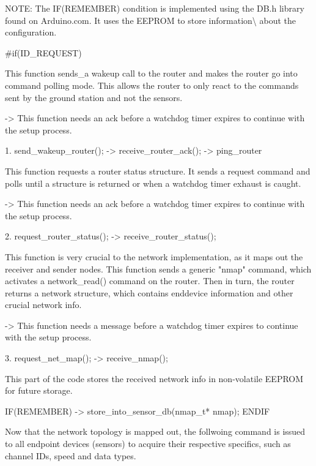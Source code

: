 N\-O\-T\-E\-: The I\-F(\-R\-E\-M\-E\-M\-B\-E\-R) condition is implemented using the D\-B.\-h library found on Arduino.\-com. It uses the E\-E\-P\-R\-O\-M to store information\textbackslash{} about the configuration. \begin{DoxyVerb}#if(ID_REQUEST)


       This function sends_a wakeup call to the router and makes the
       router go into command polling mode. This allows the router to
       only react to the commands sent by the ground station and not the
       sensors.

       -> This function needs an ack before a watchdog timer expires
          to continue with the setup process.

     1. send_wakeup_router();
            -> receive_router_ack();
            -> ping_router


       This function requests a router status structure. It sends a
       request command and polls until a structure is returned or when a
       watchdog timer exhaust is caught.

       -> This function needs an ack before a watchdog timer expires
          to continue with the setup process.

     2. request_router_status();
            -> receive_router_status();


       This function is very crucial to the network implementation, as
       it maps out the receiver and sender nodes. This function sends a
       generic "nmap" command, which activates a network_read() command on
       the router. Then in turn, the router returns a network structure,
       which contains enddevice information and other crucial network info.

       -> This function needs a message before a watchdog timer expires
          to continue with the setup process.

     3. request_net_map();
            -> receive_nmap();


               This part of the code stores the received network info in
               non-volatile EEPROM for future storage.\

            IF(REMEMBER)
                -> store_into_sensor_db(nmap_t* nmap);
            ENDIF


       Now that the network topology is mapped out, the follwoing command
       is issued to all endpoint devices (sensors) to acquire their
       respective specifics, such as channel IDs, speed and data types.


\end{DoxyVerb}
